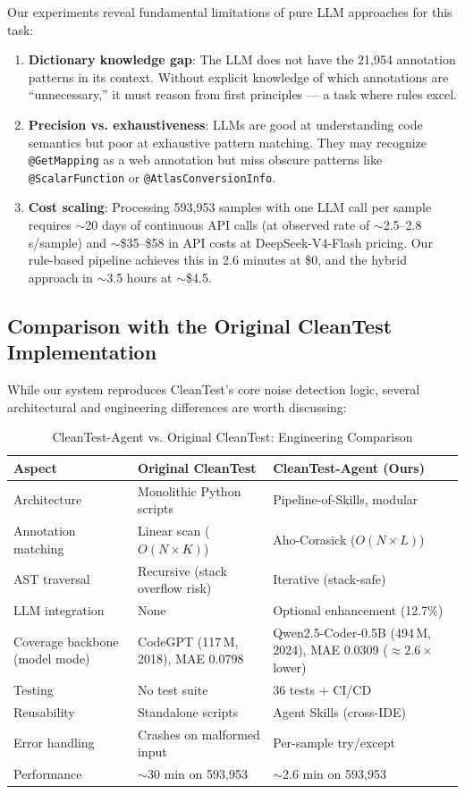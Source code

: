 \documentclass[acmlarge,nonacm,screen]{acmart}
\begin{document}
Our experiments reveal fundamental limitations of pure LLM approaches for this task:

\begin{enumerate}
    \item \textbf{Dictionary knowledge gap}: The LLM does not have the 21,954 annotation patterns in its context. Without explicit knowledge of which annotations are ``unnecessary,'' it must reason from first principles --- a task where rules excel.
    \item \textbf{Precision vs. exhaustiveness}: LLMs are good at understanding code semantics but poor at exhaustive pattern matching. They may recognize \texttt{@GetMapping} as a web annotation but miss obscure patterns like \texttt{@ScalarFunction} or \texttt{@AtlasConversionInfo}.
    \item \textbf{Cost scaling}: Processing 593,953 samples with one LLM call per sample requires $\sim$20 days of continuous API calls (at observed rate of $\sim$2.5--2.8\,s/sample) and $\sim$\$35--\$58 in API costs at DeepSeek-V4-Flash pricing. Our rule-based pipeline achieves this in 2.6 minutes at \$0, and the hybrid approach in $\sim$3.5 hours at $\sim$\$4.5.
\end{enumerate}

\subsection{Comparison with the Original CleanTest Implementation}

While our system reproduces CleanTest's core noise detection logic, several architectural and engineering differences are worth discussing:

\begin{table}[htbp]
\caption{CleanTest-Agent vs. Original CleanTest: Engineering Comparison}
\label{tab:eng-comparison}
\begin{tabular}{@{}lp{4.5cm}p{4.5cm}@{}}
\toprule
\textbf{Aspect} & \textbf{Original CleanTest} & \textbf{CleanTest-Agent (Ours)} \\
\midrule
Architecture & Monolithic Python scripts & Pipeline-of-Skills, modular \\
Annotation matching & Linear scan ($O(N \times K)$) & Aho-Corasick ($O(N \times L)$) \\
AST traversal & Recursive (stack overflow risk) & Iterative (stack-safe) \\
LLM integration & None & Optional enhancement (12.7\%) \\
Coverage backbone (model mode) & CodeGPT (117\,M, 2018), MAE 0.0798 & Qwen2.5-Coder-0.5B (494\,M, 2024), MAE 0.0309 ($\approx 2.6\times$ lower) \\
Testing & No test suite & 36 tests + CI/CD \\
Reusability & Standalone scripts & Agent Skills (cross-IDE) \\
Error handling & Crashes on malformed input & Per-sample try/except \\
Performance & $\sim$30 min on 593,953 & $\sim$2.6 min on 593,953 \\
\bottomrule
\end{tabular}
\end{table}
\end{document}
